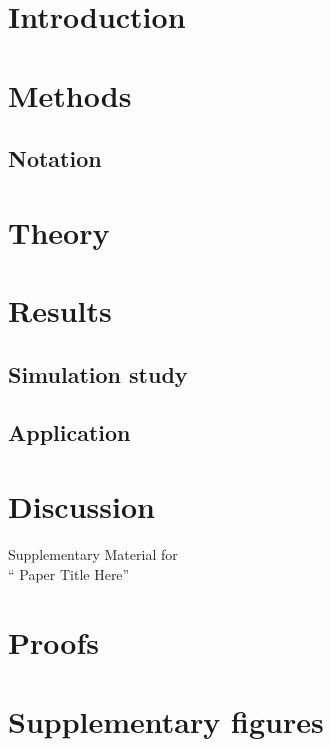 \documentclass[10pt]{article}
\title{\Title}
\author{Phillip B. Nicol}
\date{
\small{
    \textit{Department of Statistics, University of Chicago, Chicago, IL 60637, USA} \\ [2ex]
    $^*$ Correspondence: \href{mailto:pnicol@uchicago.edu}{pnicol@uchicago.edu} \\[2ex]
    }
    \normalsize{\today}
}
\newcommand{\Title}{Paper Title Here}
\numberwithin{equation}{section}
\begin{document}
\maketitle


\begin{abstract}
Abstract goes here.
\end{abstract}

\section{Introduction}



\section{Methods}

\subsection{Notation}


\section{Theory}


\section{Results}

\subsection{Simulation study}


\subsection{Application}


\section{Discussion}





\clearpage

\setcounter{page}{1}
\setcounter{section}{0}
\setcounter{table}{0}
\setcounter{figure}{0}
\renewcommand{\theHsection}{SIsection.\arabic{section}}
\renewcommand{\theHtable}{SItable.\arabic{table}}
\renewcommand{\theHfigure}{SIfigure.\arabic{figure}}
\renewcommand{\thepage}{S\arabic{page}}
\renewcommand{\thesection}{S\arabic{section}}
\renewcommand{\thetable}{S\arabic{table}}
\renewcommand{\thefigure}{S\arabic{figure}}


\begin{center}
{\LARGE Supplementary Material for \\`` \Title ''}
\end{center}

\section{Proofs}


\section{Supplementary figures}
\end{document}
